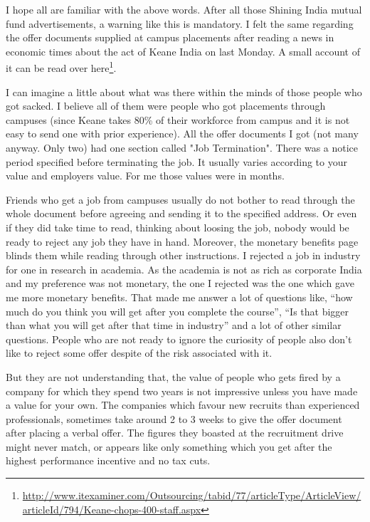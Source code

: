 \vskip 2pt


I hope all are familiar with the above words. After all those Shining India mutual fund advertisements, a warning like this is mandatory. I felt the same regarding the offer documents supplied at campus placements after reading a news in economic times about the act of Keane India on last Monday. A small account of it can be read over here\footnote{\url{http://www.itexaminer.com/Outsourcing/tabid/77/articleType/ArticleView/articleId/794/Keane-chops-400-staff.aspx}}.

I can imagine a little about what was there within the minds of those people who got sacked. I believe all of them were people who got placements through campuses (since Keane takes 80\% of their workforce from campus and it is not easy to send one with prior experience). All the offer documents I got (not many anyway. Only two) had one section called "Job Termination". There was a notice period specified before terminating the job. It usually varies according to your value and employers value. For me those values were in months.

Friends who get a job from campuses usually do not bother to read through the whole document before agreeing and sending it to the specified address. Or even if they did take time to read, thinking about loosing the job, nobody would be ready to reject any job they have in hand. Moreover, the monetary benefits page blinds them while reading through other instructions. I rejected a job in industry for one in research in academia. As the academia is not as rich as corporate India and my preference was not monetary, the one I rejected was the one which gave me more monetary benefits. That made me answer a lot of questions like, ``how much do you think you will get after you complete the course'', ``Is that bigger than what you will get after that time in industry'' and a lot of other similar questions. People who are not ready to ignore the curiosity of people also don’t like to reject some offer despite of the risk associated with it.

But they are not understanding that, the value of people who gets fired by a company for which they spend two years is not impressive unless you have made a value for your own. The companies which favour new recruits than experienced professionals, sometimes take around 2 to 3 weeks to give the offer document after placing a verbal offer. The figures they boasted at the recruitment drive might never match, or appears like only something which you get after the highest performance incentive and no tax cuts. 

